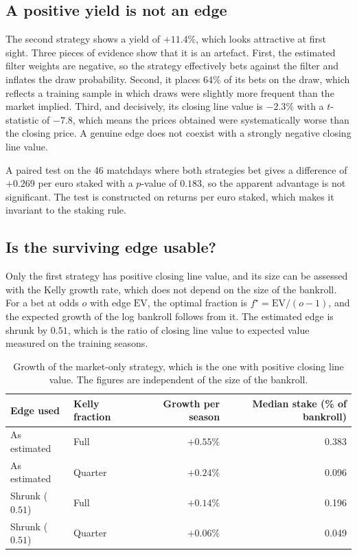 \documentclass[11pt,a4paper]{article}
\begin{document}
\subsection{A positive yield is not an edge}
The second strategy shows a yield of $+11.4\%$, which looks attractive at first sight. Three pieces of
evidence show that it is an artefact. First, the estimated filter weights are negative, so the strategy
effectively bets against the filter and inflates the draw probability. Second, it places 64\% of its
bets on the draw, which reflects a training sample in which draws were slightly more frequent than the
market implied. Third, and decisively, its closing line value is $-2.3\%$ with a $t$-statistic of
$-7.8$, which means the prices obtained were systematically worse than the closing price. A genuine
edge does not coexist with a strongly negative closing line value.

A paired test on the 46 matchdays where both strategies bet gives a difference of $+0.269$ per euro
staked with a $p$-value of $0.183$, so the apparent advantage is not significant. The test is
constructed on returns per euro staked, which makes it invariant to the staking rule.

\subsection{Is the surviving edge usable?}
Only the first strategy has positive closing line value, and its size can be assessed with the Kelly
growth rate, which does not depend on the size of the bankroll. For a bet at odds $o$ with edge
$\text{EV}$, the optimal fraction is $f^\star = \text{EV}/(o-1)$, and the expected growth of the log
bankroll follows from it. The estimated edge is shrunk by $0.51$, which is the ratio of closing line
value to expected value measured on the training seasons.

\begin{table}[H]
\centering
\begin{tabular}{llrr}
\toprule
Edge used & Kelly fraction & Growth per season & Median stake (\% of bankroll) \\
\midrule
As estimated & Full & $+0.55\%$ & 0.383 \\
As estimated & Quarter & $+0.24\%$ & 0.096 \\
Shrunk ($0.51$) & Full & $+0.14\%$ & 0.196 \\
Shrunk ($0.51$) & Quarter & $+0.06\%$ & 0.049 \\
\bottomrule
\end{tabular}
\caption{Growth of the market-only strategy, which is the one with positive closing line value. The
figures are independent of the size of the bankroll.}
\label{tab:kelly}
\end{table}
\end{document}
